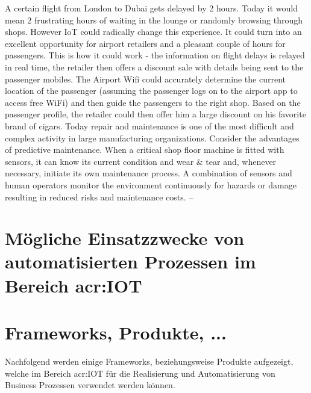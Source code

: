 A certain flight from London to Dubai gets delayed by 2 hours. Today it would mean 2 frustrating hours of waiting in the lounge or randomly browsing through shops. However IoT could radically change this experience. It could turn into an excellent opportunity for airport retailers and a pleasant couple of hours for passengers. This is how it could work - the information on flight delays is relayed in real time, the retailer then offers a discount sale with details being sent to the passenger mobiles. The Airport Wifi could accurately determine the current location of the passenger (assuming the passenger logs on to the airport app to access free WiFi) and then guide the passengers to the right shop. Based on the passenger profile, the retailer could then offer him a large discount on his favorite brand of cigars.
Today repair and maintenance is one of the most difficult and complex activity in large manufacturing organizations. Consider the advantages of predictive maintenance. When a critical shop floor machine is fitted with sensors, it can know its current condition and wear \& tear and, whenever necessary, initiate its own maintenance process. A combination of sensors and human operators monitor the environment continuously for hazards or damage resulting in reduced risks and maintenance costs.
--

\section{Mögliche Einsatzzwecke von automatisierten Prozessen im Bereich \gls{acr:IOT}}



\section{Frameworks, Produkte, ...}
Nachfolgend werden einige Frameworks, beziehungsweise Produkte aufgezeigt, welche im Bereich \gls{acr:IOT} für die Realisierung und Automatisierung von Business Prozessen verwendet werden können.

\begin{itemize}
\end{itemize}


